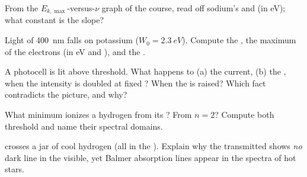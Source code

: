 \begin{exercise}[$\star$]\label{exo:g12:quantum-world:5}
From the $E_{k,\max}$-versus-$\nu$ graph of the course, read off sodium's
 and  (in \unit{eV}); what constant is the slope?
\end{exercise}

\begin{exercise}[$\star\star$]\label{exo:g12:quantum-world:6}
Light of  \qty{400}{nm} falls on potassium ($W_0 = \qty{2.3}{eV}$).
Compute the  , the maximum  of the electrons
(in \unit{eV} and ), and the .
\end{exercise}

\begin{exercise}[$\star\star$]\label{exo:g12:quantum-world:7}
A photocell is lit above threshold. What happens to (a) the current, (b) the
, when the intensity is doubled at fixed ? When
the  is raised? Which fact contradicts the  picture, and why?
\end{exercise}

\begin{exercise}[$\star\star$]\label{exo:g12:quantum-world:8}
What minimum   ionizes a hydrogen  from its ? From
$n = 2$? Compute both threshold  and name their spectral domains.
\end{exercise}

\begin{exercise}[$\star\star$]\label{exo:g12:quantum-world:9}
 crosses a jar of cool hydrogen (all  in the ).
Explain why the transmitted  shows \emph{no} dark line in the
visible, yet Balmer absorption lines appear in the spectra of hot stars.
\end{exercise}


